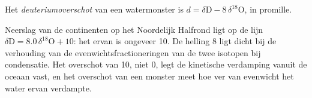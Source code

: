 \begin{definition}[Deuteriumoverschot]\label{def:b3:stable-isotopes:d-excess}
Het \emph{deuteriumoverschot} van een watermonster is $d =
\delta\mathrm D - 8\,\delta^{18}\mathrm O$, in promille.
\end{definition}

Neerslag van de continenten op het Noordelijk Halfrond ligt op de lijn
$\delta\mathrm D = 8.0\,\delta^{18}\mathrm O + 10$: het  ervan is ongeveer
\qty{10}{\permil}. De helling 8 ligt dicht bij de verhouding van de evenwichtsfractioneringen
van de twee isotopen bij condensatie. Het overschot van 10, niet 0,
legt de kinetische verdamping vanuit de oceaan vast, en het overschot van een monster
meet hoe ver van evenwicht het water ervan verdampte.

